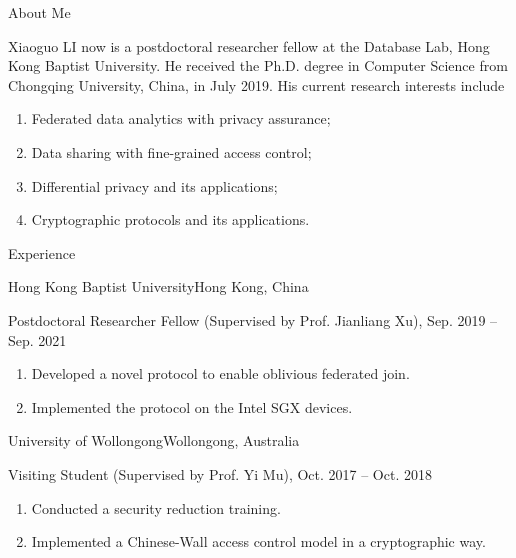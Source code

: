 \documentclass[]{mcdowellcv}
\newcommand{\graycolor}{\textcolor[rgb]{0.3,0.3,0.3}}
\begin{document}
	\makeheader
	
	\begin{cvsection}{\Large About Me}
		\begin{cvsubsection}{}{}{}\graycolor{Xiaoguo LI now is a postdoctoral researcher fellow at the Database Lab, Hong Kong Baptist University. He received the Ph.D. degree in Computer Science from Chongqing University, China, in July 2019. His current research interests include
				\begin{enumerate}
					\item Federated data analytics with privacy assurance;
					\item Data sharing with fine-grained access control;
					\item Differential privacy and its applications;
					\item Cryptographic protocols and its applications.
				\end{enumerate}}
		\end{cvsubsection}
	\end{cvsection}


	\begin{cvsection}{\Large Experience}
		\begin{cvsubsection}{Hong Kong Baptist University}{Hong Kong, China}{}
			\graycolor{Postdoctoral Researcher Fellow (Supervised by Prof. Jianliang Xu), Sep. 2019 -- Sep. 2021
				\begin{enumerate}
					\item Developed a novel protocol to enable oblivious federated join.
					\item Implemented the protocol on the Intel SGX devices.
				\end{enumerate}	
			}
		\end{cvsubsection}
		\begin{cvsubsection}{University of Wollongong}{Wollongong, Australia}{}
			\graycolor{Visiting Student (Supervised by Prof. Yi Mu), Oct. 2017 -- Oct. 2018
			\begin{enumerate}
				\item Conducted a security reduction training.
				\item Implemented a Chinese-Wall access control model in a cryptographic way.
			\end{enumerate}	
			}
		\end{cvsubsection}
	\end{cvsection}
	
\end{document}
